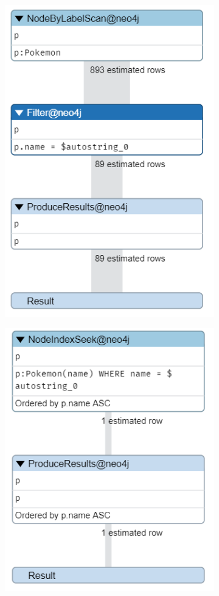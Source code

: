 \begin{figure}[H]
	\begin{subfigure}{0.5\textwidth}
		\includegraphics[width=0.9\linewidth]{img/pokemon_without_index_1.png} 
	\end{subfigure}
	\begin{subfigure}{0.5\textwidth}
		\includegraphics[width=0.9\linewidth]{img/pokemon_with_index_1.png}

\end{subfigure}
\end{figure}
